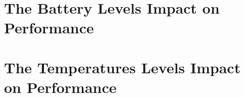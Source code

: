 






\section{The Battery Levels Impact on Performance}\label{app:charge}




\section{The Temperatures Levels Impact on Performance}\label{app:temperature}





% 
% 
% 
% 
% 

% 
% 
% 
% 

% 
% 
% 
% 

